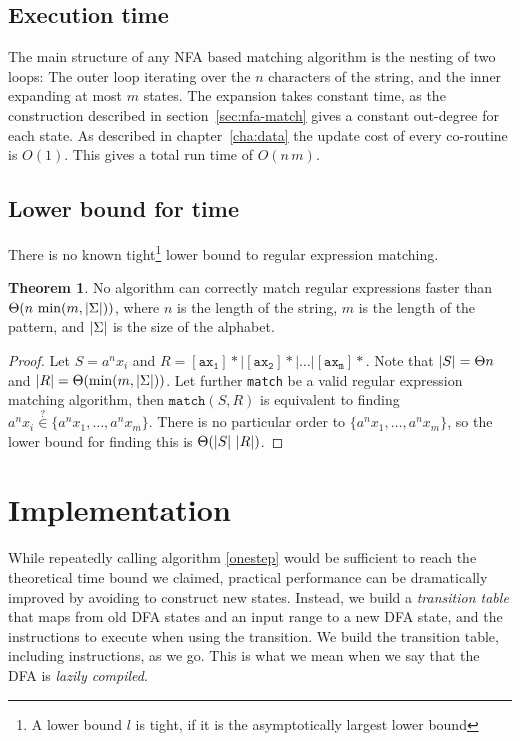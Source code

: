 \documentclass[11pt]{Thesis}
\theoremstyle{definition}
\newtheorem{thm}{Theorem}
\newcommand{\seclabel}[1]{\label{sec:#1}}
\begin{document}
\section{Execution time}
The main structure of any NFA based matching algorithm is the nesting of two 
loops: The outer loop iterating over the $n$ characters of the string, and 
the inner expanding at most $m$ states. The expansion takes constant time, as 
the construction described in section~\ref{sec:nfa-match} gives a constant 
out-degree for each state. As described in 
chapter~\ref{cha:data} the update cost of every co-routine is $O(1)$. This 
gives a total run time of $O(n\, m)$.

\section{Lower bound for time}\seclabel{lower-bound}
There is no known tight\footnote{A lower bound $l$ is tight, if it is the 
asymptotically largest lower bound} lower bound to regular expression 
matching.

\begin{thm}
  No algorithm can correctly match regular expressions faster than 
  $\Theta(n\, \min(m, \left|\Sigma\right|))$, where $n$ is the length of the string, 
  $m$ is the length of the pattern, and $\left|\Sigma\right|$ is the size of the alphabet.
\end{thm}
\begin{proof}
  Let $S=a^nx_i$ and $R=\mathtt{[ax_1]*|[ax_2]*|\dots|[ax_m]*}$. Note that 
  $\left|S\right| = \Theta{n}$ and $\left|R\right|=\Theta(\min(m, \left|\Sigma\right|))$. Let 
  further \texttt{match} be a valid regular expression matching algorithm, 
  then $\mathtt{match}(S, R)$ is equivalent to finding 
  $a^nx_i\stackrel{?}{\in} \{a^nx_1, \dots, a^nx_m\}$. There is no particular order to 
  $\{a^nx_1, \dots, a^nx_m\}$, so the lower bound for finding this is 
  $\Theta(\left|S\right|\, \left|R\right|)$.
\end{proof}

\chapter{Implementation}
While repeatedly calling algorithm \ref{onestep} would be sufficient
to reach the theoretical time bound we claimed, practical performance
can be dramatically improved by avoiding to construct new states.
Instead, we build a \emph{transition table} that maps from old DFA
states and an input range to a new DFA state, and the instructions
to execute when using the transition. We build the transition table,
including instructions, as we go. This is what we mean when we say
that the DFA is \emph{lazily compiled}. 
\end{document}
